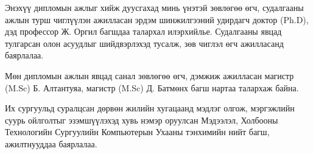 
\begin{acknowledgements}
\addchaptertocentry{\acknowledgementname}

Энэхүү дипломын ажлыг хийж дуусгахад минь үнэтэй зөвлөгөө өгч, судалгааны ажлын турш чиглүүлэн ажилласан эрдэм шинжилгээний удирдагч доктор (Ph.D), дэд профессор Ж. Оргил багшдаа талархал илэрхийлье. Судалгааны явцад тулгарсан олон асуудлыг шийдвэрлэхэд тусалж, зөв чиглэл өгч ажилласанд баярлалаа.

Мөн дипломын ажлын явцад санал зөвлөгөө өгч, дэмжиж ажилласан магистр (M.Sc) Б. Алтантуяа, магистр (M.Sc) Д. Батмөнх багш нартаа талархаж байна.

Их сургуульд суралцсан дөрвөн жилийн хугацаанд мэдлэг олгож, мэргэжлийн суурь ойлголтыг эзэмшүүлэхэд хувь нэмэр оруулсан Мэдээлэл, Холбооны Технологийн Сургуулийн Компьютерын Ухааны тэнхимийн нийт багш, ажилтнууддаа баярлалаа.


\end{acknowledgements}

